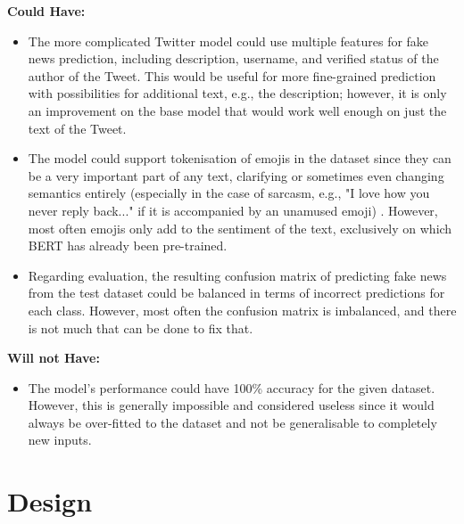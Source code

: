 \documentclass{l4proj}
\begin{document}
\textbf{Could Have:}
\begin{itemize}
    \item The more complicated Twitter model could use multiple features for fake news prediction, including description, username, and verified status of the author of the Tweet. This would be useful for more fine-grained prediction with possibilities for additional text, e.g., the description; however, it is only an improvement on the base model that would work well enough on just the text of the Tweet.
    \item The model could support tokenisation of emojis in the dataset since they can be a very important part of any text, clarifying or sometimes even changing semantics entirely (especially in the case of sarcasm, e.g., "I love how you never reply back..." if it is accompanied by an unamused emoji) \citep{EmojiSemantics}. However, most often emojis only add to the sentiment of the text, exclusively on which BERT has already been pre-trained.
    \item Regarding evaluation, the resulting confusion matrix of predicting fake news from the test dataset could be balanced in terms of incorrect predictions for each class. However, most often the confusion matrix is imbalanced, and there is not much that can be done to fix that.
\end{itemize}

\textbf{Will not Have:}
\begin{itemize}
    \item The model's performance could have 100\% accuracy for the given dataset. However, this is generally impossible and considered useless since it would always be over-fitted to the dataset and not be generalisable to completely new inputs.
\end{itemize}

\chapter{Design}
\label{chap:design}
\end{document}
